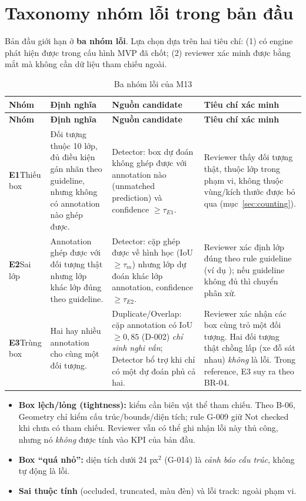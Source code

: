 \section{Taxonomy nhóm lỗi trong bản đầu}
\label{sec:errors}
Bản đầu giới hạn ở \textbf{ba nhóm lỗi}. Lựa chọn dựa trên hai tiêu chí: (1)
có engine phát hiện được trong cấu hình MVP đã chốt; (2) reviewer xác minh được
bằng mắt mà không cần dữ liệu tham chiếu ngoài.

\begin{xltabular}{\linewidth}{@{}L{1.9cm}L{3.6cm}L{3.4cm}Y@{}}
\caption{Ba nhóm lỗi của M13}\label{tab:errors}\\
\toprule
\textbf{Nhóm} & \textbf{Định nghĩa} & \textbf{Nguồn candidate} & \textbf{Tiêu chí xác minh}\\
\midrule
\endfirsthead
\toprule \textbf{Nhóm} & \textbf{Định nghĩa} & \textbf{Nguồn candidate} & \textbf{Tiêu chí xác minh}\\ \midrule
\endhead
\bottomrule
\endfoot
\textbf{E1}\newline Thiếu box & Đối tượng thuộc 10 lớp, đủ điều kiện gán nhãn theo guideline, nhưng không có annotation nào ghép được. &
Detector: box dự đoán không ghép được với annotation nào (unmatched prediction) và confidence $\ge \tau_{E1}$. &
Reviewer thấy đối tượng thật, thuộc lớp trong phạm vi, không thuộc vùng/kích thước được bỏ qua (mục~\ref{sec:counting}).\\
\textbf{E2}\newline Sai lớp & Annotation ghép được với đối tượng thật nhưng lớp khác lớp đúng theo guideline. &
Detector: cặp ghép được về hình học (IoU $\ge \tau_m$) nhưng lớp dự đoán khác lớp annotation, confidence $\ge \tau_{E2}$. &
Reviewer xác định lớp đúng theo rule guideline (ví dụ ); nếu guideline không đủ thì chuyển phân xử.\\
\textbf{E3}\newline Trùng box & Hai hay nhiều annotation cho cùng một đối tượng. &
Duplicate/Overlap: cặp annotation có IoU $\ge 0{,}85$ (D-002) \emph{chỉ sinh nghi vấn}; Detector bổ trợ khi chỉ có một dự đoán phủ cả hai. &
Reviewer xác nhận các box cùng trỏ một đối tượng. Hai đối tượng thật chồng lấp (xe đỗ sát nhau) \emph{không} là lỗi. Trong reference, E3 suy ra theo BR-04.\\
\end{xltabular}

\begin{notebox}
\begin{itemize}
  \item \textbf{Box lệch/lỏng (tightness):} kiểm cần biên vật thể tham chiếu.
        Theo B-06, Geometry chỉ kiểm cấu trúc/bounds/diện tích; rule G-009 giữ
        Not checked khi chưa có tham chiếu. Reviewer vẫn có thể ghi nhận lỗi này
        thủ công, nhưng nó \emph{không} được tính vào KPI của bản đầu.
  \item \textbf{Box ``quá nhỏ'':} diện tích dưới 24 px$^2$ (G-014) là
        \emph{cảnh báo cấu trúc}, không tự động là lỗi.
  \item \textbf{Sai thuộc tính} (occluded, truncated, màu đèn) và lỗi track: ngoài phạm vi.
\end{itemize}
\end{notebox}

